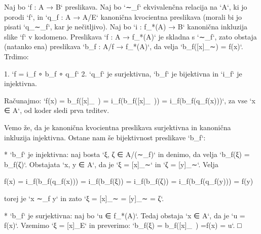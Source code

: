 Naj bo `f : A → B` preslikava. Naj bo `∼_f` ekvivalenčna relacija na `A`, ki jo porodi
`f`, in `q_f : A → A/E` kanonična kvocientna preslikava (morali bi jo pisati `q_{∼_f}`,
kar je nečitljivo). Naj bo `i : f_*(A) → B` kanonična inkluzija slike `f` v kodomeno.
Preslikava `f : A → f_*(A)` je skladna s `∼_f`, zato obstaja (natanko ena) preslikava
`b_f : A/f → f_*(A)`, da velja `b_f([x]_∼) = f(x)`. Trdimo:

1. `f = i_f ∘ b_f ∘ q_f`
2. `q_f` je surjektivna, `b_f` je bijektivna in `i_f` je injektivna.

Računajmo: `f(x) = b_f([x]_~) = i_f(b_f([x]_~)) = i_f(b_f(q_f(x)))`, za vse `x ∈ A`, od
koder sledi prva trditev.

Vemo že, da je kanonična kvocientna preslikava surjektivna in kanonična inkluzija
injektivna. Ostane nam še bijektivnost preslikave `b_f`:

* `b_f` je injektivna: naj bosta `ξ, ζ ∈ A/(∼_f)` in denimo, da velja `b_f(ξ) = b_f(ζ)`.
  Obstajata `x, y ∈ A`, da je `ξ = [x]_∼` in `ζ = [y]_∼`. Velja

        f(x) = i_f(b_f(q_f(x))) = i_f(b_f(ξ)) = i_f(b_f(ζ)) = i_f(b_f(q_f(y))) = f(y)

  torej je `x ∼_f y` in zato `ξ = [x]_∼ = [y]_∼ = ζ`.

* `b_f` je surjektivna: naj bo `u ∈ f_*(A)`. Tedaj obstaja `x ∈ A`, da je `u = f(x)`.
  Vzemimo `ξ = [x]_E` in preverimo: `b_f(ξ) = b_f([x]_~) =f(x) = u`. □
